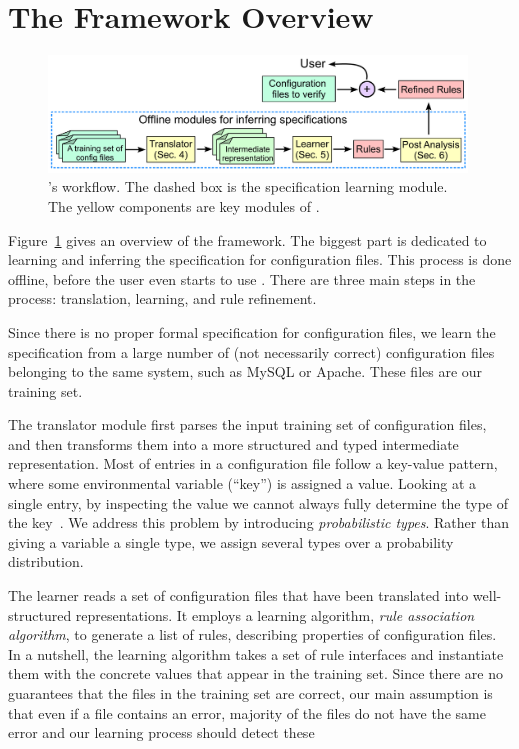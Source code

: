 
\section{The \app Framework Overview}

\begin{figure}[tbp] \centering
\includegraphics[width=0.99\textwidth]{figs/overview}
\caption{\app's workflow.
  The dashed box is the specification learning module. 
  The yellow components are key modules of \app.}
\label{fig-overview}
\end{figure}

Figure~\ref{fig-overview} gives an overview of the \app framework.
The biggest part is dedicated to 
learning and inferring the specification for configuration 
files. This process is done offline, before the user even starts 
to use \app. There are three main steps in the process:
translation, learning, and rule refinement.

Since there is no proper formal specification for configuration 
files, we learn the specification from a large number of 
(not necessarily correct) configuration files belonging to the same 
system, such as MySQL or Apache. These files are our training set.


The translator module first parses the input training  
set of configuration files, and then transforms them into 
a more structured and typed intermediate representation.
Most of entries in a configuration file follow a key-value pattern, 
where some environmental variable (``key'') is assigned  a value.
Looking at a single entry, by inspecting the value
we cannot always fully determine the type of the key~\cite{xu15hey}.
We address this problem 
by introducing {\em probabilistic types}.
Rather than giving a variable a single type, 
we assign several types over a probability distribution. 

The learner reads a set of configuration files that have been translated
into well-structured representations. 
It employs a learning algorithm, {\em rule association 
algorithm}, to generate a list of rules, describing properties 
of configuration files. In a nutshell, the learning algorithm 
takes a set of rule interfaces and instantiate them with the concrete
values that appear in the training set. Since there are no guarantees 
that the files in the training set are correct, our main assumption
is that even if a file contains an error, majority of the files do not 
have the same error and our learning process should detect these

